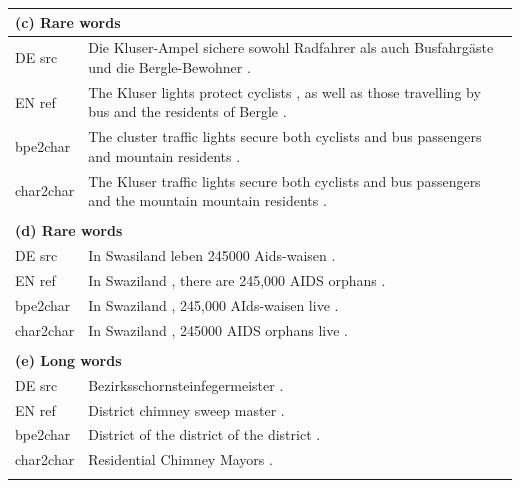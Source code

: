\documentclass[11pt,letterpaper]{article}
\newcommand{\tb}{\textbf}
\newcommand{\clr}{\color{Red}}
\begin{document}
\begin{table}[t]
\footnotesize
\centering
\begin{tabular}{p{1.4cm}|p{14.6cm}}

\multicolumn{2}{l}{\tb{(c) Rare words}} \\ \hline \hline
DE src  & Die {\clr Kluser-Ampel} sichere sowohl Radfahrer als auch Busfahrg\"aste und die Bergle-Bewohner . \\ \hline
EN ref  & The {\clr Kluser lights} protect cyclists , as well as those travelling by bus and the residents of Bergle . \\ \hline
bpe2char & The {\clr cluster traffic lights} secure both cyclists and bus passengers and mountain residents . \\ \hline
char2char &  The {\clr Kluser traffic lights} secure both cyclists and bus passengers and the mountain mountain residents . \\ \hline
\multicolumn{2}{l}{}       \\

\multicolumn{2}{l}{\tb{(d) Rare words}} \\ \hline \hline
DE src  & In Swasiland leben 245000 {\clr Aids-waisen} . \\ \hline
EN ref  & In Swaziland , there are 245,000 {\clr AIDS orphans} . \\ \hline
bpe2char & In Swaziland , 245,000 {\clr AIds-waisen} live . \\ \hline
char2char & In Swaziland , 245000 {\clr AIDS orphans} live . \\ \hline
\multicolumn{2}{l}{}       \\

\multicolumn{2}{l}{\tb{(e) Long words}} \\ \hline \hline
DE src  & Bezirks{\clr schornsteinfegermeister} . \\ \hline
EN ref  & District {\clr chimney sweep master} .  \\ \hline
bpe2char &  District of the {\clr district of the district} . \\ \hline
char2char & Residential {\clr Chimney Mayors} . \\ \hline
\multicolumn{2}{l}{}       \\


\end{tabular}
\end{table}
\end{document}
